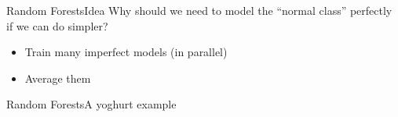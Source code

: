 \documentclass[xcolor={usenames,dvipsnames}]{beamer}
\begin{document}
\begin{frame}{Random Forests}{Idea}
Why should we need to model the ``normal class'' perfectly if we can do simpler?
\begin{itemize}
	\item Train many imperfect models (in parallel)
	\item Average them
\end{itemize}
\end{frame}
\begin{frame}{Random Forests}{A yoghurt example}



\end{frame}
\end{document}
